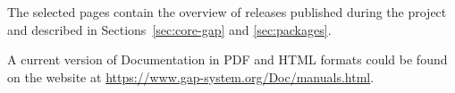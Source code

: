 \documentclass{deliverablereport}
\begin{document}
The selected pages contain the overview of \GAP releases published
during the project and described in Sections~\ref{sec:core-gap} and \ref{sec:packages}.

A current version of \GAP Documentation in PDF and HTML formats
could be found on the \GAP website at \url{https://www.gap-system.org/Doc/manuals.html}.

%



\clearpage
{}
\printbibliography
\end{document}
